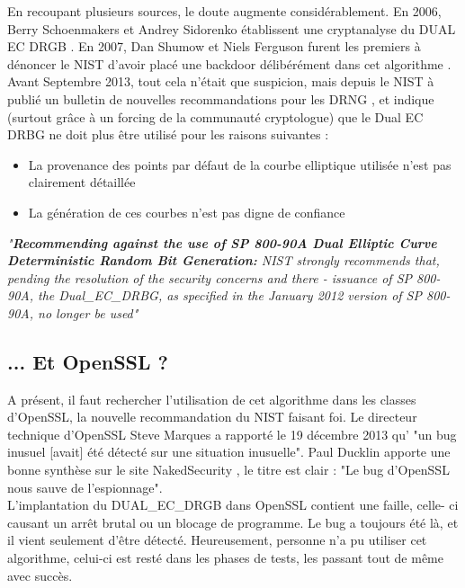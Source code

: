 	En recoupant plusieurs sources, le doute augmente considérablement.	En 2006, Berry Schoenmakers et Andrey Sidorenko établissent une 
	cryptanalyse du DUAL EC DRGB \cite{dualecrbg2006berry}.	
	En 2007, Dan Shumow et Niels Ferguson furent les premiers à dénoncer le 
	NIST d'avoir placé une backdoor délibérément dans cet algorithme
	\cite{shumow2007nist}.\\
	
	Avant Septembre 2013, tout cela n'était que suspicion, mais depuis le 
	NIST à publié un bulletin de nouvelles recommandations pour les DRNG
	\cite{newRecomendingNist}, et indique (surtout grâce à un forcing de 
	la communauté cryptologue) que le Dual EC DRBG ne doit plus être utilisé 
	pour les raisons suivantes :
	\begin{itemize}
		\item La provenance des points par défaut de la courbe elliptique 
		utilisée n'est pas clairement détaillée
		\item La génération de ces courbes n'est pas digne de confiance\\
	\end{itemize}
	\textit{"\textbf{Recommending against the use of SP 800-90A Dual Elliptic 
	Curve Deterministic Random Bit Generation:} NIST strongly recommends that, 
	pending the resolution of the security concerns and there - issuance of SP 
	800-90A, the Dual\_EC\_DRBG, as specified in the January 2012 version of 
	SP 800-90A, no longer be used"}\\

	\subsection{... Et OpenSSL ?}
	
	A présent, il faut rechercher l'utilisation de cet algorithme dans les 
	classes d'OpenSSL, la nouvelle recommandation du NIST faisant foi.
	Le directeur technique d'OpenSSL Steve Marques a rapporté le 19 décembre 
	2013 qu' "un bug inusuel [avait] été détecté sur une situation inusuelle". 
	Paul Ducklin apporte une bonne synthèse sur le site NakedSecurity
	\cite{duckin2013openssl}, le titre est clair : "Le bug d'OpenSSL nous
	sauve de l'espionnage".\\
	
	
	L'implantation du DUAL\_EC\_DRGB dans OpenSSL contient une faille, celle-
	ci causant un arrêt brutal ou un blocage de programme.
	Le bug a toujours été là, et il vient seulement d'être détecté.	
	Heureusement, personne n'a pu utiliser cet algorithme, celui-ci est resté 
	dans les phases de tests, les passant tout de même avec succès.\\

